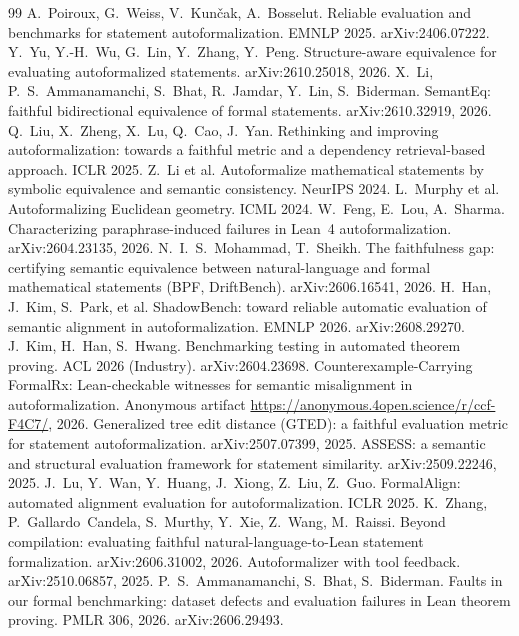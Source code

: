 \documentclass[10pt]{article}
\theoremstyle{definition}
\begin{document}
\begin{thebibliography}{99}\small
{} A.~Poiroux, G.~Weiss, V.~Kun\v{c}ak, A.~Bosselut. Reliable evaluation and benchmarks for statement autoformalization. EMNLP 2025. arXiv:2406.07222.
 Y.~Yu, Y.-H.~Wu, G.~Lin, Y.~Zhang, Y.~Peng. Structure-aware equivalence for evaluating autoformalized statements. arXiv:2610.25018, 2026.
 X.~Li, P.~S.~Ammanamanchi, S.~Bhat, R.~Jamdar, Y.~Lin, S.~Biderman. SemantEq: faithful bidirectional equivalence of formal statements. arXiv:2610.32919, 2026.
 Q.~Liu, X.~Zheng, X.~Lu, Q.~Cao, J.~Yan. Rethinking and improving autoformalization: towards a faithful metric and a dependency retrieval-based approach. ICLR 2025.
 Z.~Li et al. Autoformalize mathematical statements by symbolic equivalence and semantic consistency. NeurIPS 2024.
 L.~Murphy et al. Autoformalizing Euclidean geometry. ICML 2024.
 W.~Feng, E.~Lou, A.~Sharma. Characterizing paraphrase-induced failures in Lean~4 autoformalization. arXiv:2604.23135, 2026.
 N.~I.~S.~Mohammad, T.~Sheikh. The faithfulness gap: certifying semantic equivalence between natural-language and formal mathematical statements (BPF, DriftBench). arXiv:2606.16541, 2026.
 H.~Han, J.~Kim, S.~Park, et al. ShadowBench: toward reliable automatic evaluation of semantic alignment in autoformalization. EMNLP 2026. arXiv:2608.29270.
 J.~Kim, H.~Han, S.~Hwang. Benchmarking testing in automated theorem proving. ACL 2026 (Industry). arXiv:2604.23698.
 Counterexample-Carrying FormalRx: Lean-checkable witnesses for semantic misalignment in autoformalization. Anonymous artifact \url{https://anonymous.4open.science/r/ccf-F4C7/}, 2026.
 Generalized tree edit distance (GTED): a faithful evaluation metric for statement autoformalization. arXiv:2507.07399, 2025.
 ASSESS: a semantic and structural evaluation framework for statement similarity. arXiv:2509.22246, 2025.
 J.~Lu, Y.~Wan, Y.~Huang, J.~Xiong, Z.~Liu, Z.~Guo. FormalAlign: automated alignment evaluation for autoformalization. ICLR 2025.
 K.~Zhang, P.~Gallardo~Candela, S.~Murthy, Y.~Xie, Z.~Wang, M.~Raissi. Beyond compilation: evaluating faithful natural-language-to-Lean statement formalization. arXiv:2606.31002, 2026.
 Autoformalizer with tool feedback. arXiv:2510.06857, 2025.
 P.~S.~Ammanamanchi, S.~Bhat, S.~Biderman. Faults in our formal benchmarking: dataset defects and evaluation failures in Lean theorem proving. PMLR 306, 2026. arXiv:2606.29493.

\end{thebibliography}
\end{document}
